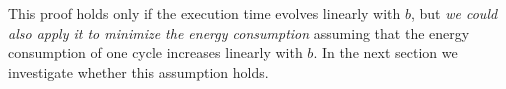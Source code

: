    This proof holds only if the execution time evolves linearly with $b$, but
   \textit{we could also apply it to minimize the energy consumption} assuming
   that the energy consumption of one cycle increases linearly with $b$. In the
   next section we investigate whether this assumption holds.

